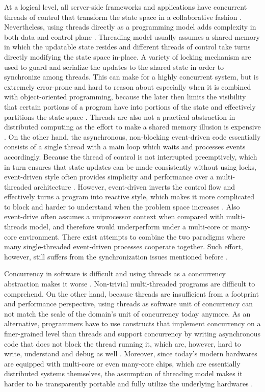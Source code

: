 At a logical level, all server-side frameworks and applications have concurrent threads of control that transform the state space in a collaborative fashion \cite{UCAM-CL-TR-769}. Nevertheless, using threads directly as a programming model adds complexity in both data and control plane \cite{UCAM-CL-TR-769}\cite{Lee:2006:PT:1137232.1137289}. Threading model usually assumes a shared memory in which the updatable state resides and different threads of control take turns directly modifying the state space in-place. A variety of locking mechanism are used to guard and serialize the updates to the shared state in order to synchronize among threads. This can make for a highly concurrent system, but is extremely error-prone and hard to reason about especially when it is combined with object-oriented programming, because the later then limits the visibility that certain portions of a program have into portions of the state and effectively partitions the state space \cite{Lee:2006:PT:1137232.1137289}. Threads are also not a practical abstraction in distributed computing as the effort to make a shared memory illusion is expensive \cite{Lee:2006:PT:1137232.1137289}. On the other hand, the asynchronous, non-blocking event-driven code essentially consists of a single thread with a main loop which waits and processes events accordingly. Because the thread of control is not interrupted preemptively, which in turn ensures that state updates can be made consistently without using locks, event-driven style often provides simplicity and performance over a multi-threaded architecture \cite{UCAM-CL-TR-769}. However, event-driven inverts the control flow and effectively turns a program into reactive style, which makes it more complicated to block and harder to understand when the problem space increases \cite{von2003events}. Also event-drive often assumes a uniprocessor context when compared with multi-threads model, and therefore would underperform under a multi-core or many-core environment. There exist attempts to combine the two paradigms where many single-threaded event-driven processes cooperate together. Such effort, however, still suffers from the synchronization issues mentioned before \cite{von2003events}.

Concurrency in software is difficult and using threads as a concurrency abstraction makes it worse \cite{Lee:2006:PT:1137232.1137289}. Non-trivial multi-threaded programs are difficult to comprehend. On the other hand, because threads are insufficient from a footprint and performance perspective, using threads as software unit of concurrency can not match the scale of the domain's unit of concurrency today anymore. As an alternative, programmers have to use constructs that implement concurrency on a finer-grained level than threads and support concurrency by writing asynchronous code that does not block the thread running it, which are, however, hard to write, understand and debug as well \cite{java-loom}. Moreover, since today's modern hardwares are equipped with multi-core or even many-core chips, which are essentially distributed systems themselves, the assumption of threading model makes it harder to be transparently portable and fully utilize the underlying hardwares \cite{UCAM-CL-TR-769}. 

